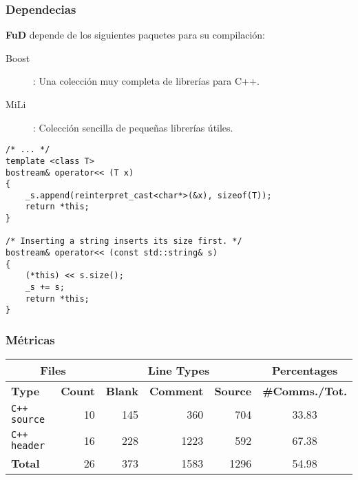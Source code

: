 \documentclass[xcolor=pdftex,dvipsnames,table,10pt,babel,spanish]{beamer}
\begin{document}

\begin{frame}[fragile]
  \frametitle{Dependecias}
  
  \textbf{FuD} depende de los siguientes paquetes para su compilaci\'on:
  \begin{description}
  \item [Boost]: Una colecci\'on muy completa de librer\'ias para C++.
  \pause
  \item [MiLi]: Colecci\'on sencilla de peque\~nas librer\'ias \'utiles.
  \end{description}
  
  \pause
\lstset{language=C++}
\begin{lstlisting}[frame=single]
/* ... */
template <class T>
bostream& operator<< (T x)
{
    _s.append(reinterpret_cast<char*>(&x), sizeof(T));
    return *this;
}

/* Inserting a string inserts its size first. */
bostream& operator<< (const std::string& s)
{
    (*this) << s.size();
    _s += s;
    return *this;
}
\end{lstlisting}


\end{frame}


  \begin{frame}
  
    \frametitle{M\'etricas}
    
    \begin{center}
      \begin{tabular}{|l|r|r|r|r|c|}
      \hline
      \multicolumn{2}{|c|}{Files} & \multicolumn{3}{|c|}{Line Types} & Percentages \\
      \hline
      \textbf{Type} & \textbf{Count} & \textbf{Blank} & \textbf{Comment} & \textbf{Source} & \small{\textbf{\#Comms./Tot.}}\\
      \hline
      \texttt{C++ source} & 10   &    145  &     360   &    704 & 33.83 \\
      \hline
      \texttt{C++ header} & 16   &    228  &    1223   &    592 &  67.38 \\
      \hline
      \textbf{Total}      &  26  &     373 &     1583  &    1296 & 54.98 \\
      \hline
      \end{tabular}
    \end{center}

  \end{frame}
\end{document}
